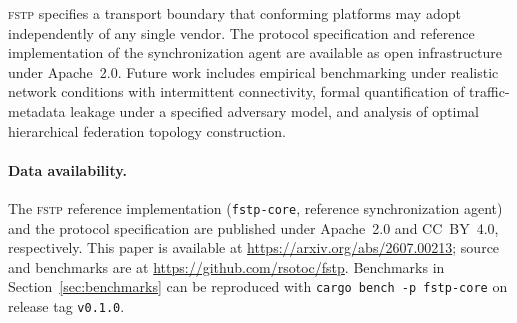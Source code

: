 \documentclass[12pt]{article}
\newcommand{\FSTP}{\textsc{fstp}}
\begin{document}
	\FSTP{} specifies a transport boundary that conforming platforms may
	adopt independently of any single vendor. The protocol specification
	and reference implementation of the synchronization agent are
	available as open infrastructure under Apache~2.0. Future work includes empirical benchmarking under realistic
	network conditions with intermittent connectivity, formal quantification
	of traffic-metadata leakage under a specified adversary model, and
	analysis of optimal hierarchical federation topology construction.

	\paragraph{Data availability.}
	The \FSTP{} reference implementation (\texttt{fstp-core}, reference
	synchronization agent) and the protocol specification are published
	under Apache~2.0 and CC~BY~4.0, respectively. This paper is available
	at \url{https://arxiv.org/abs/2607.00213}; source and benchmarks are
	at \url{https://github.com/rsotoc/fstp}. Benchmarks in
	Section~\ref{sec:benchmarks} can be reproduced with
	\texttt{cargo bench -p fstp-core} on release tag \texttt{v0.1.0}.
	
\end{document}
